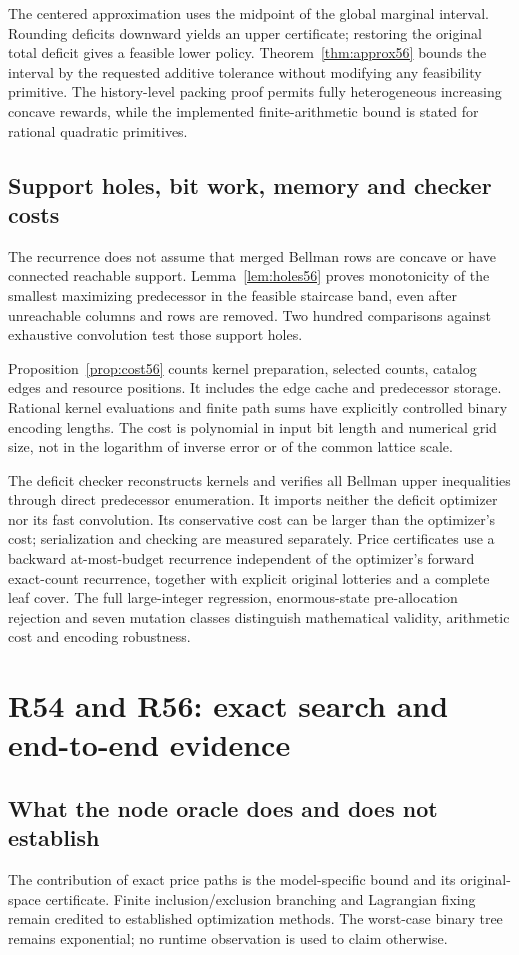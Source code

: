 The centered approximation uses the midpoint of the global marginal interval. Rounding deficits downward yields an upper certificate; restoring the original total deficit gives a feasible lower policy. Theorem~\ref{thm:approx56} bounds the interval by the requested additive tolerance without modifying any feasibility primitive. The history-level packing proof permits fully heterogeneous increasing concave rewards, while the implemented finite-arithmetic bound is stated for rational quadratic primitives.

\subsection{Support holes, bit work, memory and checker costs}
The recurrence does not assume that merged Bellman rows are concave or have connected reachable support. Lemma~\ref{lem:holes56} proves monotonicity of the smallest maximizing predecessor in the feasible staircase band, even after unreachable columns and rows are removed. Two hundred comparisons against exhaustive convolution test those support holes.

Proposition~\ref{prop:cost56} counts kernel preparation, selected counts, catalog edges and resource positions. It includes the edge cache and predecessor storage. Rational kernel evaluations and finite path sums have explicitly controlled binary encoding lengths. The cost is polynomial in input bit length and numerical grid size, not in the logarithm of inverse error or of the common lattice scale.

The deficit checker reconstructs kernels and verifies all Bellman upper inequalities through direct predecessor enumeration. It imports neither the deficit optimizer nor its fast convolution. Its conservative cost can be larger than the optimizer's cost; serialization and checking are measured separately. Price certificates use a backward at-most-budget recurrence independent of the optimizer's forward exact-count recurrence, together with explicit original lotteries and a complete leaf cover. The full large-integer regression, enormous-state pre-allocation rejection and seven mutation classes distinguish mathematical validity, arithmetic cost and encoding robustness.

\section{R54 and R56: exact search and end-to-end evidence}
\subsection{What the node oracle does and does not establish}
The contribution of exact price paths is the model-specific bound and its original-space certificate. Finite inclusion/exclusion branching and Lagrangian fixing remain credited to established optimization methods. The worst-case binary tree remains exponential; no runtime observation is used to claim otherwise.

